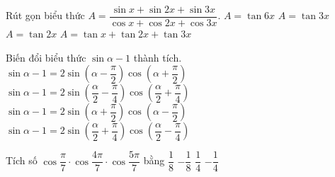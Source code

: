 \begin{ex}%
	Rút gọn biểu thức  $A=\dfrac{\sin x+\sin 2x+\sin 3x}{\cos x+\cos 2x+\cos 3x}$.
	\choice 
		{$A=\tan 6x$} 
		{$A=\tan  3x$}
		 {\True $A=\tan 2x$}
		{$A=\tan x+\tan  2x+\tan 3x$}
\end{ex}

\begin{ex}%
	Biến đổi biểu thức $\sin \alpha-1$ thành tích. 
	 \choice
		{$\sin \alpha -1=2\sin \left( \alpha -\dfrac {\pi }{2} \right)\cos \left( \alpha  +\dfrac {\pi }{2} \right)$}
		{\True $\sin \alpha -1=2\sin \left( \dfrac {\alpha }{2}-\dfrac {\pi }{4} \right)\cos \left( \dfrac {\alpha }{2}+\dfrac  {\pi }{4} \right)$}
		{$\sin \alpha  -1=2\sin \left(\alpha +\dfrac {\pi }{2} \right)\cos \left( \alpha -\dfrac {\pi }{2} \right)$}
		{$\sin \alpha -1=2\sin  \left( \dfrac {\alpha }{2}+\dfrac {\pi }{4} \right)\cos \left( \dfrac {\alpha }{2}-\dfrac {\pi }{4} \right)$}
\end{ex}

\begin{ex}%
	Tích số ${\cos  \dfrac{\pi }{7}\cdot \cos \dfrac{4\pi }{7}\cdot \cos \dfrac{5\pi }{7}}$ bằng
	\choice 
		{\True $\dfrac  {1}{8}$}
		 {$-\dfrac {1}{8}$}
		{$\dfrac  {1}{4}$}
		{$-\dfrac {1}{4}$} 
\end{ex}

